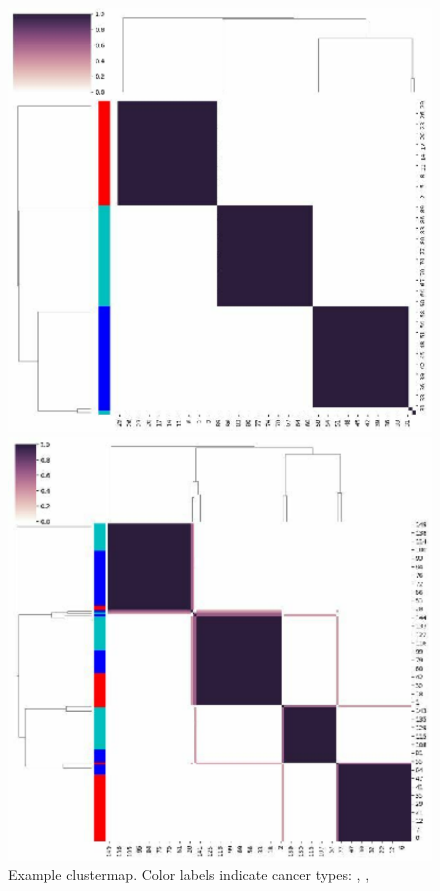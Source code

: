 \documentclass{article}
\begin{document}
\begin{figure}[!htp]
\centering
\begin{minipage}{.5\linewidth}
	\includegraphics[scale=0.3]{figures/example_clustermap.pdf}
\end{minipage}%
\begin{minipage}{.5\linewidth}
	\includegraphics[scale=0.3]{figures/ovarian_breast_colorectal_clustermap_pca_tissue_on.pdf}
\end{minipage}
	\caption{Example clustermap. Color labels indicate cancer types: \color{red}{Type I}, \color{blue}{Type II}, \color{cyan}{Type III}}
\end{figure}
\end{document}
